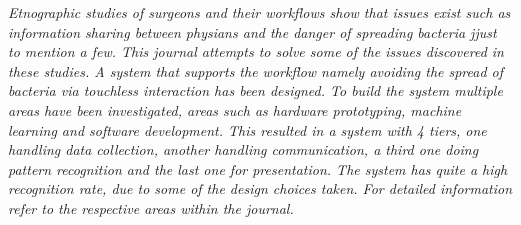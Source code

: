 \textit{Etnographic studies of surgeons and their workflows show that issues exist such as information sharing between physians and the danger of spreading bacteria jjust to mention a few.
This journal attempts to solve some of the issues discovered in these studies.
A system that supports the workflow namely avoiding the spread of bacteria via touchless interaction has been designed.
To build the system multiple areas have been investigated, areas such as hardware prototyping, machine learning and software development.
This resulted in a system with 4 tiers, one handling data collection, another handling communication, a third one doing pattern recognition and the last one for presentation.
The system has quite a high recognition rate, due to some of the design choices taken.
For detailed information refer to the respective areas within the journal.
}